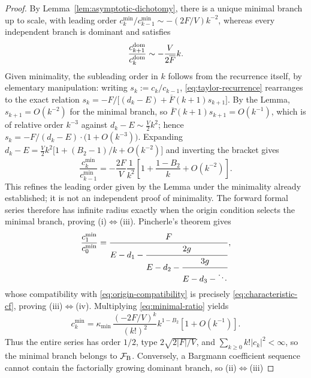 \documentclass[11pt]{article}
\theoremstyle{remark}
\begin{document}
\begin{proof}
By Lemma~\ref{lem:asymptotic-dichotomy}, there is a unique minimal branch
up to scale, with leading order \(c_k^{\min}/c_{k-1}^{\min}\sim
-(2F/V)k^{-2}\), whereas every independent branch is dominant and
satisfies
\begin{equation}
 \frac{c_{k+1}^{\rm dom}}{c_k^{\rm dom}}
 \sim-\frac{V}{2\overline F}k.
 \label{eq:dominant-ratio}
\end{equation}
Given minimality, the subleading order in \(k\) follows from the
recurrence itself, by elementary manipulation: writing
\(s_k:=c_k/c_{k-1}\), \eqref{eq:taylor-recurrence} rearranges to the exact
relation \(s_k=-F/\bigl[(d_k-E)+\overline F(k+1)s_{k+1}\bigr]\).  By the
Lemma, \(s_{k+1}=O(k^{-2})\) for the minimal branch, so
\(\overline F(k+1)s_{k+1}=O(k^{-1})\), which is of relative order
\(k^{-3}\) against \(d_k-E\sim\tfrac V2k^2\); hence
\(s_k=-F/(d_k-E)\cdot\bigl(1+O(k^{-3})\bigr)\).  Expanding
\(d_k-E=\tfrac V2k^2\bigl[1+(B_2-1)/k+O(k^{-2})\bigr]\) and inverting the
bracket gives
\begin{equation}
 \frac{c_k^{\min}}{c_{k-1}^{\min}}
 =-\frac{2F}{V}\frac1{k^2}
 \left[1+\frac{1-B_2}{k}+O(k^{-2})\right].
 \label{eq:minimal-ratio}
\end{equation}
This refines the leading order given by the Lemma under the minimality
already established; it is not an independent proof of minimality.
The forward formal series therefore has infinite radius exactly when the
origin condition selects the minimal branch, proving (i)\(\Leftrightarrow\)(iii).
Pincherle's theorem \cite[Theorem~1.1]{Gautschi1967Recurrence} gives
\begin{equation}
 \frac{c_1^{\min}}{c_0^{\min}}
 =\frac{F}{
 E-d_1-\cfrac{2g}{
 E-d_2-\cfrac{3g}{
 E-d_3-\ddots}}},
 \label{eq:minimal-first-ratio}
\end{equation}
whose compatibility with \eqref{eq:origin-compatibility} is precisely
\eqref{eq:characteristic-cf}, proving (iii)\(\Leftrightarrow\)(iv).
Multiplying \eqref{eq:minimal-ratio} yields
\begin{equation}
 c_k^{\min}
 =\kappa_{\min}\,\frac{(-2F/V)^k}{(k!)^2}
 k^{1-B_2}\left[1+O(k^{-1})\right].
 \label{eq:minimal-coefficients}
\end{equation}
Thus the entire series has order \(1/2\), type
\(2\sqrt{2|F|/V}\), and
\(\sum_{k\ge0}k!|c_k|^2<\infty\), so the minimal branch belongs to
\(\mathcal F_{\rm B}\).  Conversely, a Bargmann coefficient sequence cannot
contain the factorially growing dominant branch, so (ii)\(\Leftrightarrow\)(iii)

\end{proof}
\end{document}

